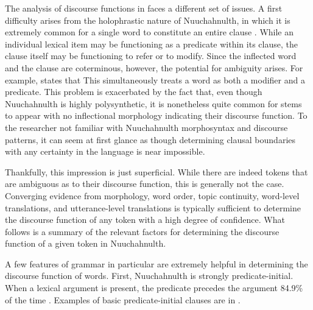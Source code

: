 The analysis of discourse functions in  faces a different set of issues. A first difficulty arises from the holophrastic nature of Nuuchahnulth, in which it is extremely common for a single word to constitute an entire clause . While an individual lexical item may be functioning as a predicate within its clause, the clause itself may be functioning to refer or to modify. Since the inflected word and the clause are coterminous, however, the potential for ambiguity arises. For example, \textcite[113]{Nakayama2001} states that  This simultaneously treats a word as both a modifier and a predicate. This problem is exacerbated by the fact that, even though Nuuchahnulth is highly polysynthetic, it is nonetheless quite common for stems to appear with no inflectional morphology indicating their discourse function. To the researcher not familiar with Nuuchahnulth morphosyntax and discourse patterns, it can seem at first glance as though determining clausal boundaries with any certainty in the language is near impossible.

Thankfully, this impression is just superficial. While there are indeed tokens that are ambiguous as to their discourse function, this is generally not the case. Converging evidence from morphology, word order, topic continuity, word-level translations, and utterance-level translations is typically sufficient to determine the discourse function of any token with a high degree of confidence. What follows is a summary of the relevant factors for determining the discourse function of a given token in Nuuchahnulth.

A few features of  grammar in particular are extremely helpful in determining the discourse function of words. First, Nuuchahnulth is strongly predicate-initial. When a lexical argument is present, the predicate precedes the argument 84.9\% of the time \parencite[149]{Nakayama2001}. Examples of basic predicate-initial clauses are in .

